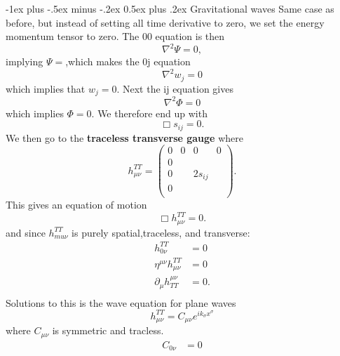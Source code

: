 \documentclass[10pt,landscape,a4paper]{article}
\makeatletter
\newcommand{\munu} {\mu\nu}
\renewcommand{\section}{\@startsection{section}{1}{0mm}%
                                {-1ex plus -.5ex minus -.2ex}%
                                {0.5ex plus .2ex}%
                                {\normalfont\large\bfseries}}
\makeatother
\begin{document}
\begin{multicols}{3}
\section{Gravitational waves}
Same case as before, but instead of setting all time derivative to zero, we set the energy momentum tensor to zero. The 00 equation is then
\begin{equation}
\nabla^2\Psi = 0,
\end{equation}
implying $\Psi = $,which makes the 0j equation 
\begin{equation}
\nabla^2 w_j = 0
\end{equation}
which implies that $w_j = 0$.
Next the ij equation gives
\begin{equation}
\nabla^2\Phi = 0
\end{equation}
which implies $\Phi = 0$.
We therefore end up with
\begin{equation}
\Box s_{ij} = 0.
\end{equation}
We then go to the \textbf{traceless transverse gauge} where 
\begin{equation}
h_{\munu}^{TT} = \begin{pmatrix}
0&0&0&0\\
0 &&&\\
0 &&2s_{ij} &\\
0&&&\\
\end{pmatrix}.
\end{equation}
This gives an equation of motion
\begin{equation}
\Box h_{\munu}^{TT} = 0.
\end{equation}
and since $h_{mu\nu}^{TT}$ is purely spatial,traceless, and transverse:
\begin{equation}
\begin{split}
h_{0\nu}^{TT} &= 0\\
\eta^{\munu}h_{\munu}^{TT} &= 0\\
\partial_\mu h_{TT}^{\munu} &= 0.\\
\end{split}
\end{equation}
Solutions to this is the wave equation for plane waves
\begin{equation}
h_{\munu}^{TT} = C_{\munu}e^{ik_\sigma x^\sigma}
\end{equation}
where $C_{\munu}$ is symmetric and tracless.
\begin{equation}
\begin{split}
C_{0\nu} &= 0\\

\end{split}
\end{equation}
\end{multicols}
\end{document}
